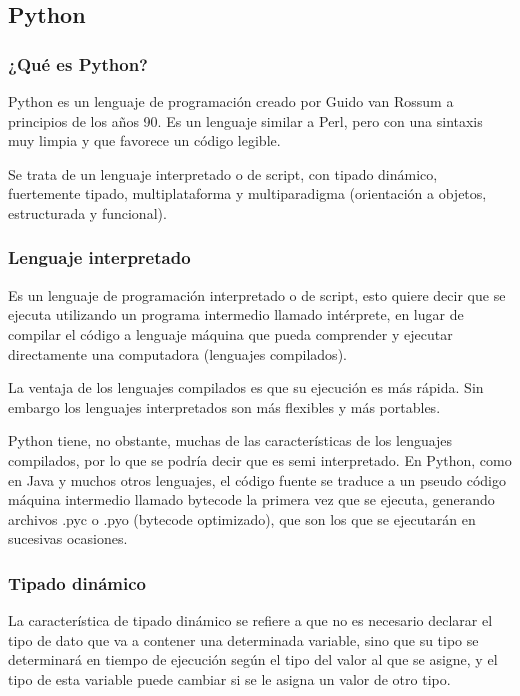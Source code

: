\documentclass[12pt,a4paper]{report}
\begin{document}
		\subsection{Python}

			\subsubsection{¿Qué es Python?}

Python es un lenguaje de programación creado por Guido van Rossum a principios de los años 90.  Es un lenguaje similar a Perl, pero con una sintaxis muy limpia y que favorece un código legible.

Se trata de un lenguaje interpretado o de script, con tipado dinámico, fuertemente tipado, multiplataforma y multiparadigma (orientación a objetos, estructurada y funcional).

			\subsubsection{Lenguaje interpretado}

Es un lenguaje de programación interpretado o de script, esto quiere decir que se ejecuta utilizando un programa intermedio llamado intérprete, en lugar de compilar el código a lenguaje máquina que pueda comprender y ejecutar directamente una computadora (lenguajes compilados).

La ventaja de los lenguajes compilados es que su ejecución es más rápida. Sin embargo los lenguajes interpretados son más flexibles y más portables.

Python tiene, no obstante, muchas de las características de los lenguajes compilados, por lo que se podría decir que es semi interpretado. En Python, como en Java y muchos otros lenguajes, el código fuente se
traduce a un pseudo código máquina intermedio llamado bytecode la primera vez que se ejecuta, generando archivos .pyc o .pyo (bytecode optimizado), que son los que se ejecutarán en sucesivas ocasiones.


			\subsubsection{Tipado dinámico}

La característica de tipado dinámico se refiere a que no es necesario declarar el tipo de dato que va a contener una determinada variable, sino que su tipo se determinará en tiempo de ejecución según el tipo del valor al que se asigne, y el tipo de esta variable puede cambiar si se le asigna un valor de otro tipo.
\end{document}
